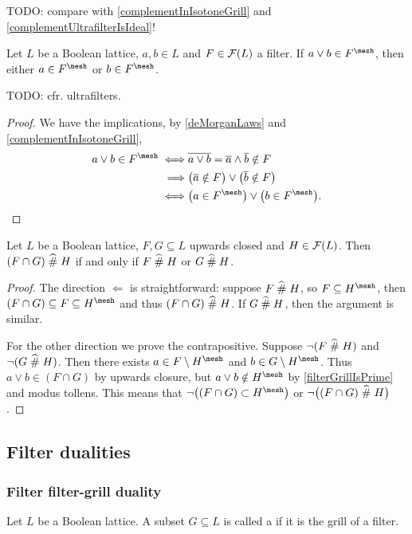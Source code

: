 TODO: compare with \ref{complementInIsotoneGrill} and \ref{complementUltrafilterIsIdeal}!


\begin{proposition}\label{filterGrillIsPrime}
Let $L$ be a Boolean lattice, $a,b\in L$ and $F \in \operatorname{\mathcal{F}}(L)$ a filter. If $a\vee b\in F^\mesh$, then either $a\in F^\mesh$ or $b\in F^\mesh$.
\end{proposition}
TODO: cfr. ultrafilters.
\begin{proof}
We have the implications, by \ref{deMorganLaws} and \ref{complementInIsotoneGrill},
\begin{align*}
a \vee b\in F^\mesh \iff& \overline{a\vee b} = \overline{a}\wedge\overline{b} \notin F \\
\implies& \big(\overline{a} \notin F\big)\lor \big(\overline{b} \notin F\big) \\
\iff& \big(a \in F^\mesh\big)\lor \big(b \in F^\mesh\big).
\end{align*}
\end{proof}

\begin{lemma} \label{subsetsFilterGrillIntersectionPrime}
Let $L$ be a Boolean lattice, $F,G\subseteq L$ upwards closed and $H\in \operatorname{\mathcal{F}}(L)$. Then $(F\cap G)\mathrel{\widehat{\#}} H$ \textup{if and only if} $F\mathrel{\widehat{\#}} H$ or $G \mathrel{\widehat{\#}} H$.
\end{lemma}
\begin{proof}
The direction $\Leftarrow$ is straightforward: suppose $F\mathrel{\widehat{\#}} H$, so $F\subseteq H^\mesh$, then $(F\cap G) \subseteq F \subseteq H^\mesh$ and thus $(F\cap G)\mathrel{\widehat{\#}} H$. If $G\mathrel{\widehat{\#}} H$, then the argument is similar.

For the other direction we prove the contrapositive. Suppose
$\neg(F\mathrel{\widehat{\#}} H)$ and $\neg(G \mathrel{\widehat{\#}} H)$. Then there exists $a\in F \setminus H^\mesh$ and $b\in G \setminus H^\mesh$. Thus $a\vee b\in (F\cap G)$ by upwards closure, but $a\vee b\notin H^\mesh$ by \ref{filterGrillIsPrime} and modus tollens. This means that $\neg\big((F\cap G)\subset H^\mesh\big)$ or $\neg\big((F\cap G)\mathrel{\widehat{\#}} H\big)$.
\end{proof}

\subsection{Filter dualities}
\subsubsection{Filter filter-grill duality}
\begin{definition}
Let $L$ be a Boolean lattice. A subset $G\subseteq L$ is called a  if it is the grill of a filter.
\end{definition}

